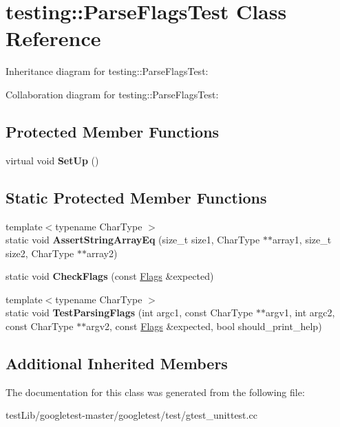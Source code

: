 \hypertarget{classtesting_1_1ParseFlagsTest}{}\section{testing\+:\+:Parse\+Flags\+Test Class Reference}
\label{classtesting_1_1ParseFlagsTest}


Inheritance diagram for testing\+:\+:Parse\+Flags\+Test\+:


Collaboration diagram for testing\+:\+:Parse\+Flags\+Test\+:
\subsection*{Protected Member Functions}
\begin{DoxyCompactItemize}
\item 
\mbox{\label{classtesting_1_1ParseFlagsTest_a72fd683f0bc0c2701d9a183c6b20cb48}} 
virtual void {\bfseries Set\+Up} ()
\end{DoxyCompactItemize}
\subsection*{Static Protected Member Functions}
\begin{DoxyCompactItemize}
\item 
\mbox{\label{classtesting_1_1ParseFlagsTest_a5d93780e65e1aa304334a8d4372c51fc}} 
{\footnotesize template$<$typename Char\+Type $>$ }\\static void {\bfseries Assert\+String\+Array\+Eq} (size\+\_\+t size1, Char\+Type $\ast$$\ast$array1, size\+\_\+t size2, Char\+Type $\ast$$\ast$array2)
\item 
\mbox{\label{classtesting_1_1ParseFlagsTest_a5919553c35ebe3910fcff51cc0b59fd6}} 
static void {\bfseries Check\+Flags} (const \hyperlink{structtesting_1_1Flags}{Flags} \&expected)
\item 
\mbox{\label{classtesting_1_1ParseFlagsTest_ad769e5f5a71939c3a9ad853b415fa9d2}} 
{\footnotesize template$<$typename Char\+Type $>$ }\\static void {\bfseries Test\+Parsing\+Flags} (int argc1, const Char\+Type $\ast$$\ast$argv1, int argc2, const Char\+Type $\ast$$\ast$argv2, const \hyperlink{structtesting_1_1Flags}{Flags} \&expected, bool should\+\_\+print\+\_\+help)
\end{DoxyCompactItemize}
\subsection*{Additional Inherited Members}


The documentation for this class was generated from the following file\+:\begin{DoxyCompactItemize}
\item 
test\+Lib/googletest-\/master/googletest/test/gtest\+\_\+unittest.\+cc\end{DoxyCompactItemize}
